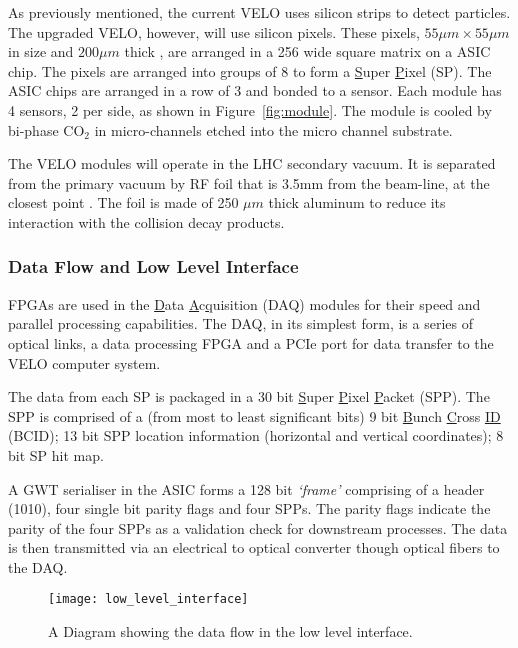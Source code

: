       As previously mentioned, the current VELO uses silicon strips to detect particles.
      The upgraded VELO, however, will use silicon pixels.
      These pixels, $55 \mu m \times 55 \mu m$ in size and $200 \mu m$ thick \cite{velo_design_report}, are arranged in a 256 wide square matrix on a ASIC chip.
      The pixels are arranged into groups of 8 to form a \underline{S}uper \underline{P}ixel (SP).
      The ASIC chips are arranged in a row of 3 and bonded to a sensor.
      Each module has 4 sensors, 2 per side, as shown in Figure~\ref{fig:module}. 
      The module is cooled by bi-phase CO$_2$ in micro-channels etched into the micro channel substrate. \cite{velo_design_report}
      \par
      The VELO modules will operate in the LHC secondary vacuum.
      It is separated from the primary vacuum by RF foil that is 3.5mm from the beam-line, at the closest point \cite{velo_design_report}.
      The foil is made of 250 $\mu m$ thick aluminum to reduce its interaction with the collision decay products. 

      \subsubsection{Data Flow and Low Level Interface}   

      FPGAs are used in the \underline{D}ata \underline{A}c\underline{q}uisition (DAQ) modules for their speed and parallel processing capabilities.
      The DAQ, in its simplest form, is a series of optical links, a data processing FPGA and a PCIe port for data transfer to the VELO computer system.
      \par
      The data from each SP is packaged in a 30 bit \underline{S}uper \underline{P}ixel \underline{P}acket (SPP). The SPP is comprised of  a (from most to least significant bits) 9 bit \underline{B}unch \underline{C}ross \underline{ID} (BCID); 13 bit SPP location information (horizontal and vertical coordinates); 8 bit SP hit map.
      \par
      A GWT serialiser in the ASIC forms a 128 bit \textit{`frame'} comprising of a header (1010), four single bit parity flags and four SPPs.
      The parity flags indicate the parity of the four SPPs as a validation check for downstream processes.
      The data is then transmitted via an electrical to optical converter though optical fibers to the DAQ.
      
      \begin{figure}[ht]
        \centering
        \texttt{[image: low\_level\_interface]}
        \caption{A Diagram showing the data flow in the low level interface.}
        \label{fig:lli}
      \end{figure}
      
